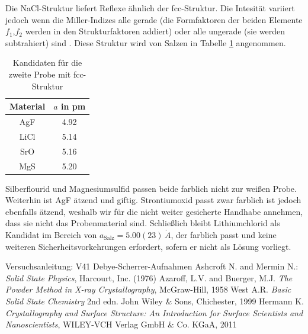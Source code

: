 \noindent
Die NaCl-Struktur liefert Reflexe ähnlich der fcc-Struktur. Die Intesität variiert jedoch wenn die Miller-Indizes alle gerade
(die Formfaktoren der beiden Elemente $f_1$,$f_2$ werden in den Strukturfaktoren addiert) oder alle ungerade (sie werden subtrahiert) sind \cite{Azaroff}. Diese
Struktur wird von Salzen in Tabelle \ref{tab:matProb2} angenommen.
\begin{table}[H]
 \begin{tabular}{cc}
Material &$a$ in pm\\
\hline
AgF & 4.92\\ %
LiCl & 5.14\\ %
SrO& 5.16\\ %
MgS & 5.20  %
 \end{tabular}
 \caption{Kandidaten für die zweite Probe mit fcc-Struktur \cite{Gitterparameter}\cite{Salz}}
 \label{tab:matProb2}

\end{table}
\noindent Silberflourid und Magnesiumsulfid passen beide farblich nicht zur weißen Probe. Weiterhin ist AgF ätzend und giftig. Strontiumoxid passt
zwar farblich ist jedoch ebenfalls ätzend, weshalb wir für die nicht weiter gesicherte Handhabe annehmen, dass sie nicht das Probenmaterial sind. 
Schließlich bleibt Lithiumchlorid als Kandidat im Bereich von $a_\text{Salz} = 5.00(23)\, \mathring{A} $, der farblich passt und keine weiteren Sicherheitsvorkehrungen erfordert, sofern er nicht als Lösung
vorliegt. 

\begin{thebibliography}{xxx}
 Versuchsanleitung: V41 Debye-Scherrer-Aufnahmen
 Ashcroft N. and Mermin N.: \textit{Solid State Physics}, Harcourt, Inc. (1976) 
  Azaroff,  L.V.  and  Buerger,  M.J.  \textit{The  Powder  Method  in  X-ray  Crystallography},  McGraw-Hill,  1958
  West A.R. \textit{Basic Solid State Chemistry}  2nd edn. John Wiley \& Sons, Chichester, 1999
  Hermann K. \textit{Crystallography and Surface Structure: An Introduction for Surface Scientists and Nanoscientists}, WILEY-VCH Verlag GmbH \& Co. KGaA, 2011
\end{thebibliography}







